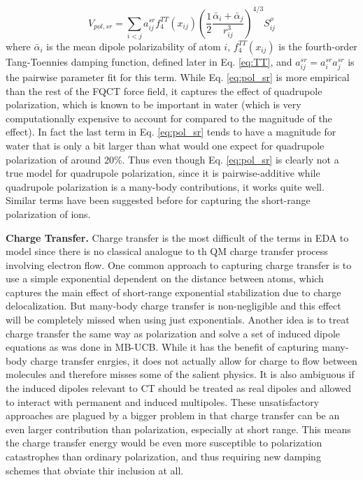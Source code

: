 \documentclass[journal=jctcce,manuscript=article]{achemso}
\begin{document}
\begin{equation}
  V_{pol,sr}=\sum_{i<j}a_{ij}^{sr}f_4^{TT}(x_{ij})\left(\frac{1}{2}\frac{\bar{\alpha}_i + \bar{\alpha}_j}{r_{ij}^3}\right)^{4/3}S_{ij}^{\rho}
\label{eq:pol_sr}
\end{equation}
where $\bar{\alpha}_i$ is the mean dipole polarizability of atom $i$, $f_4^{TT}(x_{ij})$
is the fourth-order Tang-Toennies damping function, defined later in Eq. \ref{eq:TT}, and $a_{ij}^{sr}=a_{i}^{sr}a_{j}^{sr}$ is
the pairwise parameter fit for this term. While Eq. \ref{eq:pol_sr} is more empirical than the rest of the FQCT force field, it captures the effect of quadrupole polarization, which is known to be important
in water\cite{herman2023accurate} (which is very computationally expensive to account for compared to the magnitude of the effect). In fact the last term in Eq. \ref{eq:pol_sr} tends to have a magnitude for water
that is only a bit larger than what would one expect for quadrupole polarization of around 20\%. Thus even though Eq. \ref{eq:pol_sr} is clearly
not a true model for quadrupole polarization, since it is pairwise-additive
while quadrupole polarization is a many-body contributions, it works quite well. Similar terms
have been suggested before for capturing the short-range polarization of ions.\cite{sheng2022semiempirical}

\textbf{Charge Transfer.} Charge transfer is the most difficult of the terms in EDA to model since there is no classical analogue to th QM charge transfer process involving electron flow. One common approach to
capturing charge transfer is to use a simple exponential dependent on the distance
between atoms\cite{rackers2021polarizable}, which captures the main effect of short-range exponential stabilization due to charge delocalization. But many-body charge transfer is non-negligible and this effect will be completely
missed when using just exponentials. Another idea is to treat charge transfer the same way as polarization and solve a set of induced dipole equations as was done in MB-UCB.\cite{das2019development,wang2023general}
While it has the benefit of capturing many-body charge transfer enrgies, it does not actually allow for charge to flow between molecules
and therefore misses some of the salient physics. It is also ambiguous if the induced
dipoles relevant to CT should be treated as real dipoles and allowed to interact 
with permanent and induced multipoles. These unsatisfactory approaches are plagued by a bigger problem in that charge transfer can be an even larger contribution than polarization, especially at short range. This means the charge transfer energy would be even more susceptible to
polarization catastrophes than ordinary polarization, and thus requiring new damping schemes that obviate thir inclusion at all.
\end{document}
